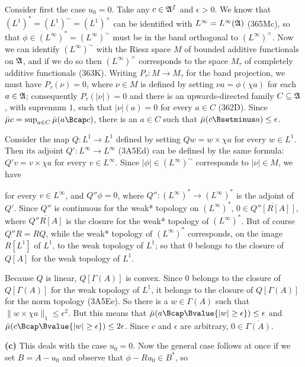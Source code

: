 {Consider first the case $u_0=0$.   Take any $c\in\frak A^f$ and
$\epsilon>0$.   We know that $(L^1)^*=(L^1)^{\sim}=(L^1)^{\times}$ can
be identified with $L^{\infty}=L^{\infty}(\frak A)$ (365Mc), so that
$\phi\in (L^{\infty})^*=(L^{\infty})^{\sim}$ must be in the band
orthogonal to $(L^{\infty})^{\times}$.   Now we can identify
$(L^{\infty})^{\sim}$ with the Riesz space $M$ of bounded additive
functionals on $\frak A$, and if we do so then $(L^{\infty})^{\times}$
corresponds to the space $M_{\tau}$ of completely additive functionals
(363K).   Writing $P_{\tau}:M\to M_{\tau}$ for the band projection, we
must have $P_{\tau}(\nu)=0$, where $\nu\in M$ is defined by setting 
$\nu a=\phi(\chi a)$ for each $a\in\frak A$;  consequently
$P_{\tau}(|\nu|)=0$ and
there is an upwards-directed family $C\subseteq\frak A$, with supremum
$1$, such that $|\nu|(a)=0$ for every $a\in C$ (362D).   Since
$\bar\mu c=\sup_{a\in C}\bar\mu(a\Bcap c)$, there is an $a\in C$ such
that $\bar\mu(c\Bsetminus a)\le\epsilon$.
     
Consider the map $Q:L^1\to L^1$ defined by setting $Qw=w\times\chi a$
for every $w\in L^1$.   Then its adjoint $Q':L^{\infty}\to L^{\infty}$
(3A5Ed) can be defined by the same formula:  $Q'v=v\times\chi a$ for
every $v\in L^{\infty}$.   Since $|\phi|\in (L^{\infty})^{\sim}$
corresponds to $|\nu|\in M$, we have
     
     
\noindent for every $v\in L^{\infty}$, and $Q''\phi=0$, where
$Q'':(L^{\infty})^*\to(L^{\infty})^*$ is the adjoint of $Q'$.   Since
$Q''$ is continuous for the weak* topology on $(L^{\infty})^*$, $0\in
\overline{Q''[R[A]]}$, where $\overline{Q''R[A]}$ is the closure for the
weak* topology of $(L^{\infty})^*$.   But of course $Q''R=RQ$, while
the weak* topology of $(L^{\infty})^*$ corresponds, on the image
$R[L^1]$ of $L^1$, to the weak topology of $L^1$;  so that $0$ belongs
to the closure of $Q[A]$ for the weak topology of $L^1$.
     
Because $Q$ is linear, $Q[\Gamma(A)]$ is convex.   Since $0$ belongs to
the closure of $Q[\Gamma(A)]$ for the weak topology of $L^1$, it belongs
to the closure of $Q[\Gamma(A)]$ for the norm topology (3A5Ee).   So
there is a $w\in\Gamma(A)$ such that $\|w\times\chi a\|_1\le\epsilon^2$.
But this means that $\bar\mu(a\Bcap\Bvalue{|w|\ge\epsilon})\le\epsilon$
and $\bar\mu(c\Bcap\Bvalue{|w|\ge\epsilon})\le2\epsilon$.   Since $c$
and
$\epsilon$ are arbitrary, $0\in\overline{\Gamma(A)}$.
     
\medskip
     
{\bf (c)} This deals with the case $u_0=0$.   Now the general case
follows at once if we set $B=A-u_0$ and observe that $\phi-Ru_0\in B^*$,
so
     
}%
     
